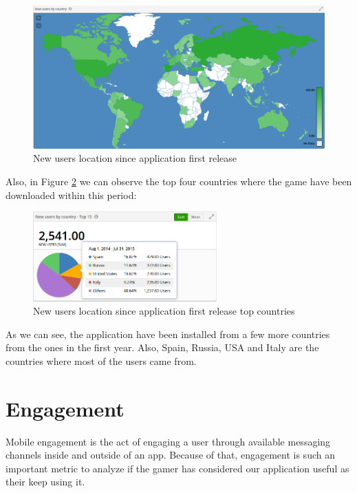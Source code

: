 \begin{figure}[h]
\centering
\includegraphics[width=350pt]{graphics/evaluation/map_users_year.png}
\caption{New users location since application first release}
\label{fig:map-all-year}
\end{figure}

Also, in Figure \ref{fig:chart-all-year} we can observe the top four countries where the game have been downloaded within this period:

\begin{figure}[h]
\centering
\includegraphics[width=200pt]{graphics/evaluation/chart_users_year.png}
\caption{New users location since application first release top countries}
\label{fig:chart-all-year}
\end{figure}

\FloatBarrier

As we can see, the application have been installed from a few more countries from the ones in the first year. Also, Spain, Russia, USA and Italy are the countries where most of the users came from.

\section{Engagement}

Mobile engagement is the act of engaging a user through available messaging channels inside and outside of an app. Because of that, engagement is such an important metric to analyze if the gamer has considered our application useful as their keep using it.

